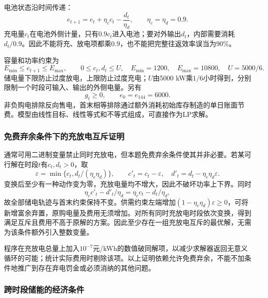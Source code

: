 电池状态沿时间传递：
\begin{equation}
 e_{t+1}=e_t+\eta_cc_t-\frac{d_t}{\eta_d},
 \qquad \eta_c=\eta_d=0.9.
 \label{eq:soc}
\end{equation}
充电量$c_t$在电池外侧计量，只有$0.9c_t$进入电池；要对外输出$d_t$，内部需要消耗$d_t/0.9$。因此不能将充、放电项都乘0.9，也不能把完整往返效率误当为90\%。

容量和功率约束为
\begin{equation}
 E_{\min}\le e_{t+1}\le E_{\max},\qquad
 0\le c_t,d_t\le U,
 \quad E_{\min}=1200,\quad E_{\max}=10800,\quad U=5000/6.
 \label{eq:limits}
\end{equation}
储电量下限防止过度放电，上限防止过度充电；$U$由5000 kW乘$1/6$小时得到，分别限制一个时段可输入、输出的外侧电量。另有
\begin{equation}
 g_t\ge0,\qquad e_0=e_{144}=6000.
 \label{eq:terminal_q1}
\end{equation}
非负购电排除反向售电，首末相等排除通过额外消耗初始库存制造的单日账面节费。模型由线性目标、线性等式和不等式组成，可直接作为LP求解。

\subsubsection{免费弃余条件下的充放电互斥证明}

通常可用二进制变量禁止同时充放电，但本题免费弃余条件使其并非必要。若某可行解在时段$t$有$c_t,d_t>0$，取
\begin{equation}
 \varepsilon=\min\{c_t,d_t/(\eta_c\eta_d)\},\qquad
 c'_t=c_t-\varepsilon,\quad
 d'_t=d_t-\eta_c\eta_d\varepsilon.
 \label{eq:q1_remove_simultaneous}
\end{equation}
变换后至少有一种动作变为零，充放电量均不增大，因此不破坏功率上下界。同时
\[
 \eta_cc'_t-d'_t/\eta_d=\eta_cc_t-d_t/\eta_d,
\]
故全部储电轨迹与首末约束保持不变。供需约束左端增加$(1-\eta_c\eta_d)\varepsilon\ge0$，可将新增富余弃置，原购电量及费用无须增加。对所有同时充放电时段依次变换，得到满足互斥且费用不高于原解的方案。因此至少存在一组充放电互斥的最优解，无需为该条件额外引入整数变量。

程序在充放电总量上加入$10^{-7}$元/kWh的数值破同解项，以减少求解器返回无意义循环的可能；统计实际费用时剔除该项。以上证明依赖允许免费弃余，不能不加条件地推广到存在弃电罚金或必须消纳的其他问题。

\subsubsection{跨时段储能的经济条件}

